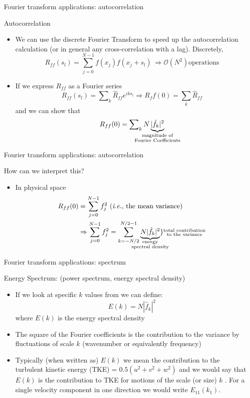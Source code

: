 \begin{frame}{Fourier transform applications: autocorrelation}

Autocorrelation
\begin{itemize}
	\item We can use the discrete Fourier Transform to speed up the autocorrelation calculation (or in general any cross-correlation with a lag). Discretely,$$R_{ff} (s_l) = \sum^{N-1}_{j=0} f(x_j) f(x_j + s_l)\ \Rightarrow \mathcal{O}(N^2) \text{operations}$$
	\item If we express $R_{ff}$ as a Fourier series$$R_{ff}(s_l) = \sum\nolimits_{k}  \hat R_{ff} e^{iks_l} \Rightarrow R_ff(0) = \sum_k \hat R_{ff}$$
	and we can show that $$R_{ff}(0) = \sum\nolimits_{k}  N\underbrace{|\hat f_k|^2}_{\mathclap{\substack{\text{magnitude of}\\\text{Fourier Coefficients}} }}$$
\end{itemize}

\end{frame}

\begin{frame}{Fourier transform applications: autocorrelation}

How can we interpret this?
\begin{itemize}
	\item In physical space
	\begin{align*}
	R_{ff}(0) &= \sum^{N-1}_{j=0} f_j^2\ (\text{\emph{i.e.}, the mean variance})\\
	&\Rightarrow \sum^{N-1}_{j=0} f_j^2 = \sum_{k=-N/2}^{N/2-1} \underbrace{N|\hat f_k|^2}_{\mathclap{\substack{\text{energy}\\\text{spectral density}} }}\}{\substack{\text{total contribution}\\\text{to the variance}}}
	\end{align*}
\end{itemize}

\end{frame}


\begin{frame}{Fourier transform applications: spectrum}

Energy Spectrum: (power spectrum, energy spectral density)
\begin{itemize}
	\item If we look at specific $k$ values from we can define: $$E(k) = N|\hat f_k|^2$$ where $E(k)$ is the energy spectral density
	\item  The square of the Fourier coefficients is the contribution to the variance by fluctuations of scale $k$ (wavenumber or equivalently frequency)
	\item Typically (when written as) $E(k)$ we mean the contribution to the turbulent kinetic energy (TKE) = $0.5(u^2+v^2+w^2)$ and we would say that $E(k)$ is the contribution to TKE for motions of the scale (or size) $k$ . For a single velocity component in one direction we would write $E_{11}(k_1)$.
\end{itemize}

\end{frame}

